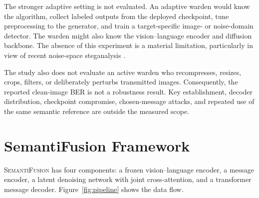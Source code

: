\documentclass[pdflatex,sn-mathphys-num]{sn-jnl}
\newcommand{\method}{\textsc{SemantiFusion}}
\begin{document}
The stronger adaptive setting is not evaluated. An adaptive warden would know the algorithm, collect labeled outputs from the deployed checkpoint, tune preprocessing to the generator, and train a target-specific image- or noise-domain detector. The warden might also know the vision--language encoder and diffusion backbone. The absence of this experiment is a material limitation, particularly in view of recent noise-space steganalysis \cite{zhu2026rethinking}.

The study also does not evaluate an active warden who recompresses, resizes, crops, filters, or deliberately perturbs transmitted images. Consequently, the reported clean-image BER is not a robustness result. Key establishment, decoder distribution, checkpoint compromise, chosen-message attacks, and repeated use of the same semantic reference are outside the measured scope.

\section{SemantiFusion Framework}
\label{sec:method}

\method{} has four components: a frozen vision--language encoder, a message encoder, a latent denoising network with joint cross-attention, and a transformer message decoder. Figure~\ref{fig:pipeline} shows the data flow.
\end{document}
